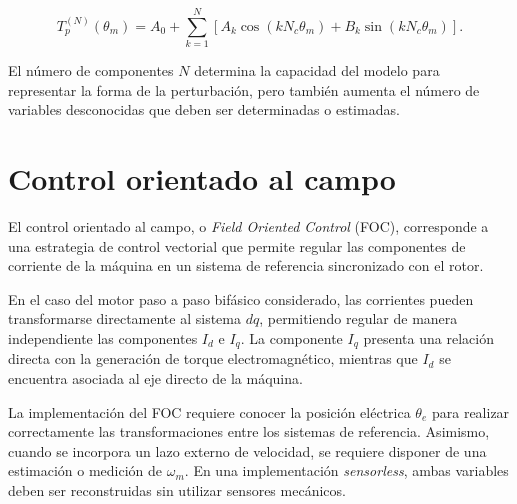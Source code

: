 \begin{equation}
\label{eq:fourier_truncada}
T_p^{(N)}(\theta_m)
=
A_0
+
\sum_{k=1}^{N}
\left[
A_k\cos(kN_c\theta_m)
+
B_k\sin(kN_c\theta_m)
\right].
\end{equation}

El número de componentes $N$ determina la capacidad del modelo para representar 
la forma de la perturbación, pero también aumenta el número de variables 
desconocidas que deben ser determinadas o estimadas.

%



\section{Control orientado al campo}

%
%

El control orientado al campo, o \textit{Field Oriented Control} (FOC), 
corresponde a una estrategia de control vectorial que permite regular las 
componentes de corriente de la máquina en un sistema de referencia sincronizado 
con el rotor.

En el caso del motor paso a paso bifásico considerado, las corrientes pueden 
transformarse directamente al sistema $dq$, permitiendo regular de manera 
independiente las componentes $I_d$ e $I_q$. La componente $I_q$ presenta una 
relación directa con la generación de torque electromagnético, mientras que 
$I_d$ se encuentra asociada al eje directo de la máquina.

La implementación del FOC requiere conocer la posición eléctrica $\theta_e$ 
para realizar correctamente las transformaciones entre los sistemas de 
referencia. Asimismo, cuando se incorpora un lazo externo de velocidad, se 
requiere disponer de una estimación o medición de $\omega_m$. En una 
implementación \textit{sensorless}, ambas variables deben ser reconstruidas 
sin utilizar sensores mecánicos.

